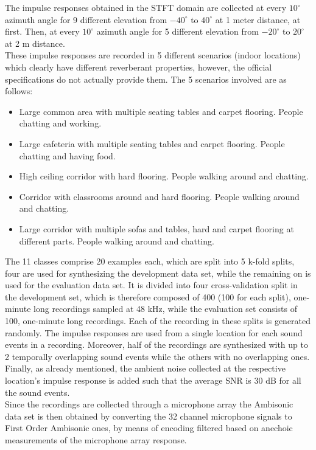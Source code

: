 \documentclass[11pt]{article}
\begin{document}
The impulse responses obtained in the STFT domain are collected at every $10^\circ$ azimuth angle for 9 different elevation from $-40^\circ$ to $40^\circ$ at 1 meter distance, at first. Then, at every $10^\circ$ azimuth angle for 5 different elevation from $-20^\circ$ to $20^\circ$ at 2 m distance.\\
These impulse responses are recorded in 5 different scenarios (indoor locations) which clearly have different reverberant properties, however, the official specifications do not actually provide them. The 5 scenarios involved are as follows:
\begin{itemize}
	\item Large common area with multiple seating tables and carpet flooring. People chatting and working.
	\item Large cafeteria with multiple seating tables and carpet flooring. People chatting and having food.
	\item High ceiling corridor with hard flooring. People walking around and chatting.
	\item Corridor with classrooms around and hard flooring. People walking around and chatting.
	\item Large corridor with multiple sofas and tables, hard and carpet flooring at different parts. People walking around and chatting.
\end{itemize}

\noindent
The 11 classes comprise 20 examples each, which are split into 5 k-fold splits, four are used for synthesizing the development data set, while the remaining on is used for the evaluation data set. It is divided into four cross-validation split in the development set, which is therefore composed of 400 (100 for each split), one-minute long recordings sampled at 48 kHz, while the evaluation set consists of 100, one-minute long recordings. Each of the recording in these splits is generated randomly. The impulse responses are used from a single location for each sound events in a recording. Moreover, half of the recordings are synthesized with up to 2 temporally overlapping sound events while the others with no overlapping ones. Finally, as already mentioned, the ambient noise collected at the respective location's impulse response is added such that the average SNR is 30 dB for all the sound events.\\
Since the recordings are collected through a microphone array the Ambisonic data set is then obtained by converting the 32 channel microphone signals to First Order Ambisonic ones, by means of encoding filtered based on anechoic measurements of the microphone array response.
\end{document}
